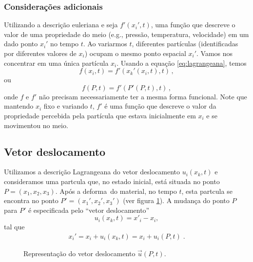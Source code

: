 \subsubsection{Considera\c{c}\~oes adicionais}
Utilizando a descri\c{c}\~ao euleriana e seja $f'(x_i',t)$, uma fun\c{c}\~ao que
descreve o valor de uma propriedade do meio (e.g., press\~ao, temperatura,
velocidade) em um dado ponto $x_i'$ no tempo $t$. Ao variarmos $t$,
diferentes part\'iculas (identificadas por diferentes valores de $x_i$) ocupam o
mesmo ponto espacial $x_i'$. Vamos nos concentrar em uma \'unica part\'icula
$x_i$. Usando a equa\c{c}\~ao \ref{eq:lagrangeana}, temos
\begin{equation}
  f(x_i,t) = f'(x_k'(x_i,t),t)\, ,
\end{equation}
ou
\begin{equation}
  f(P,t) = f'(P'(P,t),t)\, ,
\end{equation}
onde $f$ e $f'$ n\~ao precisam necessariamente ter a mesma forma funcional. Note
que mantendo $x_i$ fixo e variando $t$, $f'$ \'e uma fun\c{c}\~ao que descreve
o valor da propriedade percebida pela part\'icula que estava inicialmente em $x_i$
e se movimentou no meio.

\subsection{Vetor deslocamento}

Utilizamos a descri\c{c}\~ao Lagrangeana do 
vetor deslocamento $u_i(x_k,t)$ e consideramos uma part\ih cula que, no estado
inicial, est\'a situada no ponto $P=(x_1,x_2,x_3)$. Ap\'os a deforma\cao\
do material, no tempo $t$, esta part\ih cula se encontra
no ponto $P'=(x_1',x_2',x_3')$ (ver figura \ref{fig:vetor-deslocamento}).
A mudan\c{c}a do ponto $P$
para $P'$ \'e especificada pelo ``vetor deslocamento''
\begin{equation}
u_i(x_k , t)=x'_{i} - x_i ,
\end{equation}
tal que
\begin{eqnarray}
x_i' = x_i + u_i(x_k,t) = x_i + u_i(P,t) \; .
\label{eq:pos-deformacao}
\end{eqnarray}

\begin{figure}[!tb]
\centering
{}
\caption{Representa\c{c}\~ao do vetor deslocamento $\vec{u}(P,t)$.}
\label{fig:vetor-deslocamento}
\end{figure}


